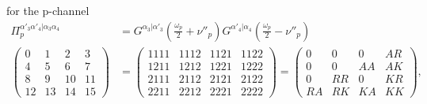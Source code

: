 \documentclass[12pt,a4paper,roman]{article}
\begin{document}
for the p-channel
\begin{align}
\Pi_p^{\alpha'_3\alpha'_4|\alpha_3\alpha_4} &= G^{\alpha_3|\alpha'_3}\left(\frac{\omega_p}{2}+\nu''_p\right)G^{\alpha'_4|\alpha_4}\left(\frac{\omega_p}{2}-\nu''_p\right)\\
\begin{pmatrix}
0  & 1  & 2   & 3\\
4  & 5  & 6   & 7\\
8  & 9  & 10 & 11\\
12& 13&14 & 15
\end{pmatrix} &=
\begin{pmatrix}
1111 & 1112 & 1121 & 1122 \\
1211 & 1212 & 1221 & 1222\\
2111 & 2112 & 2121 & 2122\\
2211& 2212 & 2221 & 2222
\end{pmatrix} = \begin{pmatrix}
0    & 0    & 0    & AR \\
0    & 0    & AA & AK\\
0    & RR & 0    & KR\\
RA & RK & KA & KK
\end{pmatrix},
\end{align}
\end{document}
